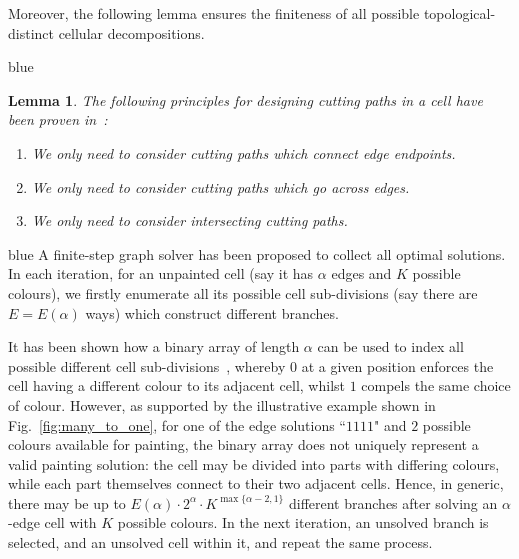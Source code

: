 \documentclass[journal]{IEEEtran}
\newtheorem{lemma}[theorem]{Lemma}
\begin{document}
Moreover, the following lemma ensures the finiteness of all possible topological-distinct cellular decompositions. %


\begin{color}{blue}
\begin{lemma}\label{lem:principles}
The following principles for designing cutting paths in a cell have been proven in~\cite{Yang2020Cellular}: 
\begin{enumerate}
\item We only need to consider cutting paths which connect edge endpoints. 
\item We only need to consider cutting paths which go across edges. 
\item We only need to consider intersecting cutting paths. 
\end{enumerate}
\end{lemma}
\end{color}

\begin{color}{blue}
A finite-step graph solver has been proposed to collect all optimal solutions.
In each iteration, for an unpainted cell (say it has $\alpha$ edges and $K$ possible colours), we firstly enumerate all its possible cell sub-divisions (say there are $E = E(\alpha)$ ways) which construct different branches. 
\end{color}
It has been shown how a binary array of length $\alpha$ can be used to index all possible different cell sub-divisions~\cite{Yang2020Cellular}, whereby $0$ at a given position enforces the cell having a different colour to its adjacent cell, whilst $1$ compels the same choice of colour. 
However, as supported by the illustrative example shown in Fig.~\ref{fig:many_to_one}, for one of the edge solutions ``$1111$" and $2$ possible colours available for painting, the binary array does not uniquely represent a valid painting solution: the cell may be divided into parts with differing colours, while each part themselves connect to their two adjacent cells. 
Hence, in generic, there may be up to $E(\alpha)\cdot 2^\alpha\cdot K^{\max\{\alpha - 2, 1\}}$ different branches after solving an $\alpha$-edge cell with $K$ possible colours. 
In the next iteration, an unsolved branch is selected, and an unsolved cell within it, and repeat the same process. 
\end{document}
